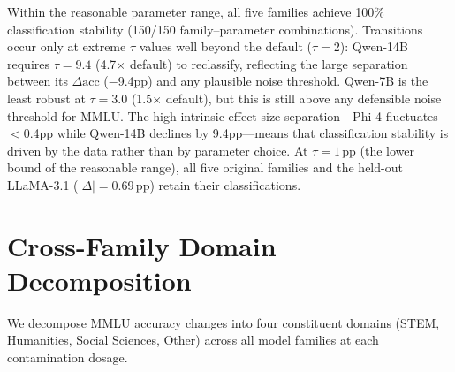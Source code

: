 \begin{table}[h]
\centering
\caption{Profile classification stability across threshold parameter ranges. All families achieve 100\% stability within the reasonable range; transitions occur only at extreme parameter values ($\geq$3$\times$ default).}
\label{tab:sensitivity}
\footnotesize
{}
\end{table}

Within the reasonable parameter range, all five families achieve 100\% classification stability (150/150 family--parameter combinations). Transitions occur only at extreme $\tau$ values well beyond the default ($\tau\!=\!2$): Qwen-14B requires $\tau\!=\!9.4$ (4.7$\times$ default) to reclassify, reflecting the large separation between its $\Delta\text{acc}$ ($-$9.4pp) and any plausible noise threshold. Qwen-7B is the least robust at $\tau\!=\!3.0$ (1.5$\times$ default), but this is still above any defensible noise threshold for MMLU. The high intrinsic effect-size separation---Phi-4 fluctuates $<$0.4pp while Qwen-14B declines by 9.4pp---means that classification stability is driven by the data rather than by parameter choice. At $\tau\!=\!1$\,pp (the lower bound of the reasonable range), all five original families and the held-out LLaMA-3.1 ($|\Delta| = 0.69$\,pp) retain their classifications.

\section{Cross-Family Domain Decomposition}
\label{sec:domain_decomposition}

We decompose MMLU accuracy changes into four constituent domains (STEM, Humanities, Social Sciences, Other) across all model families at each contamination dosage.

